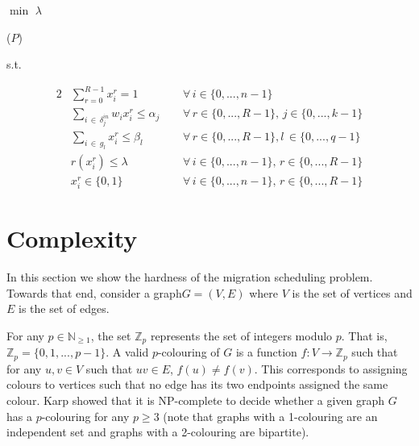 \documentclass[conference]{IEEEtran}
\begin{document}
\begin{minipage}{0.4\textwidth}
\begin{center}
    $\min$ $\lambda$
\end{center}
\end{minipage}
\begin{minipage}{0.05\textwidth}
\begin{center}
    ($P$)
\end{center}
\end{minipage}
s.t.
\begin{center}
    \begin{alignat*}{2}
        &\sum_{r=0}^{R-1} x^{r}_{i} = 1 \hspace{1cm} &&\forall \, i \in \{0, ..., n-1\} \\
        &\sum_{i \, \in \, \delta^{in}_{j}} w_{i}x^{r}_{i} \leq \alpha_{j} &&\forall \, r \in \{0, ..., R-1\}, \, j \in \{0, ..., k-1\}\\
        &\sum_{i \, \in \, g_{l}} x^{r}_{i} \leq \beta_{l} &&\forall \, r \in \{0, ..., R-1\}, l\,  \in \{0, ..., q-1\}\\
        &r(x^{r}_{i}) \leq \lambda &&\forall \, i \in \{0, ..., n - 1\}, \, r \in \{0, ..., R - 1\}\\
        &x^{r}_{i} \in \{0, 1\} &&\forall \, i \in \{0, ..., n - 1\}, \, r \in \{0, ..., R - 1\}
    \end{alignat*}
\end{center}

\vskip 0.5cm

\section{Complexity}
In this section we show the hardness of the migration scheduling problem. Towards that end, consider a graph\newline $G=(V, E)$ where $V$ is the set of vertices and $E$ is the set of edges. 

For any $p \in \mathbb{N}_{\geq 1}$, the set $\mathbb{Z}_{p}$ represents the set of integers modulo $p$. That is, $\mathbb{Z}_{p} = \{0, 1, ..., p - 1\}$. A valid $p$-colouring of $G$ is a function $f: V \rightarrow \mathbb{Z}_{p}$ such that for any $u, v \in V$ such that $uv \in E$, $f(u) \neq f(v)$. This corresponds to assigning colours to vertices such that no edge has its two endpoints assigned the same colour. Karp \cite{karp1972reducibility} showed that it is NP-complete to decide whether a given graph $G$ has a $p$-colouring for any $p \geq 3$ (note that graphs with a 1-colouring are an independent set and graphs with a 2-colouring are bipartite).
\end{document}
